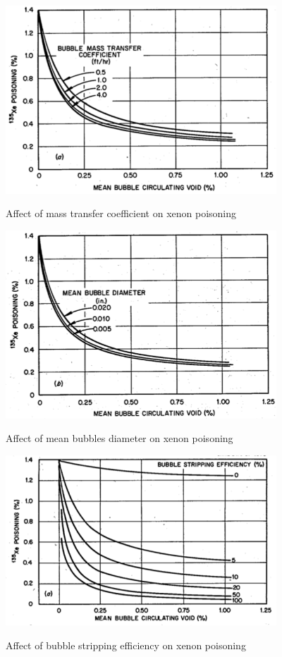 \vspace{12.7mm} %

\begin{figure}[ht]
  \centering
  \includegraphics[width=4in]{images/MSRE_mass_transfer_coeff.png}\\
  \caption{Affect of mass transfer coefficient on xenon poisoning}
  \label{fig:MSRE_mass_tranfer}
\end{figure} 

\newpage

\begin{figure}[p]
  \centering
  \includegraphics[width=4in]{images/MSRE_mean_bub_dia.png}\\
  \caption{Affect of mean bubbles diameter on xenon poisoning}
  \label{fig:MSRE_bubble_size}
\end{figure} 

\begin{figure}[p]
  \centering
  \includegraphics[width=4in]{images/MSRE_bub_stripping.png}\\
  \caption{Affect of bubble stripping efficiency on xenon poisoning}
  \label{fig:MSRE_bub_strip}
\end{figure} 

